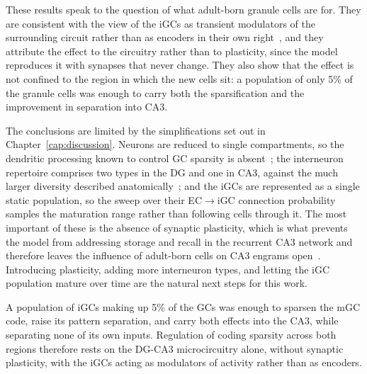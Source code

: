 These results speak to the question of what adult-born granule cells are for. They are consistent with the view of the iGCs as
transient modulators of the surrounding circuit rather than as encoders in their own right~\parencite{folszAdultborn2023,
mchughAdultborn2022}, and they attribute the effect to the circuitry rather than to plasticity, since the model reproduces it with
synapses that never change. They also show that the effect is not confined to the region in which the new cells sit: a population
of only 5\% of the granule cells was enough to carry both the sparsification and the improvement in separation into CA3.

The conclusions are limited by the simplifications set out in Chapter~\ref{cap:discussion}. Neurons are reduced to single
compartments, so the dendritic processing known to control GC sparsity is absent~\parencite{chavlisDendrites2017}; the interneuron
repertoire comprises two types in the DG and one in CA3, against the much larger diversity described
anatomically~\parencite{degroInterneuron2022}; and the iGCs are represented as a single static population, so the sweep over their
EC$\to$iGC connection probability samples the maturation range rather than following cells through it. The most important of these
is the absence of synaptic plasticity, which is what prevents the model from addressing storage and recall in the recurrent CA3
network and therefore leaves the influence of adult-born cells on CA3 engrams open~\parencite{koSystems2025,
kopsickFormation2024}. Introducing plasticity, adding more interneuron types, and letting the iGC population mature over time are
the natural next steps for this work.

A population of iGCs making up 5\% of the GCs was enough to sparsen the mGC code, raise its pattern separation, and carry both
effects into the CA3, while separating none of its own inputs. Regulation of coding sparsity across both regions therefore rests
on the DG-CA3 microcircuitry alone, without synaptic plasticity, with the iGCs acting as modulators of activity rather than as
encoders.
